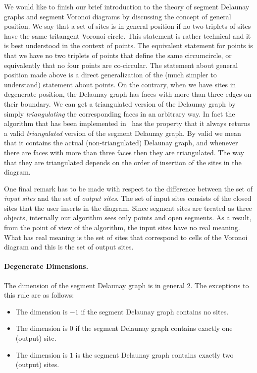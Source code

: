 We would like to finish our brief introduction to the theory of
segment Delaunay graphs and segment Voronoi diagrams by discussing the
concept of general position. We say that a set of sites is in general
position if no two triplets of sites have the same tritangent Voronoi
circle. This statement is rather technical and it is best understood
in the context of points. The equivalent statement for points is that
we have no two triplets of points that define the same circumcircle,
or equivalently that no four points are co-circular. The statement
about general position made above is a direct generalization of the
(much simpler to understand) statement about points. On the contrary,
when we have sites in degenerate position, the Delaunay graph has faces
with more than three edges on their boundary. We can get a
triangulated version of the Delaunay graph by simply {\em triangulating}
the corresponding faces in an arbitrary way. In fact the algorithm
that has been implemented in \cgal\ has the property that it always
returns a valid {\em triangulated} version of the segment Delaunay graph.
By valid we mean that it contains the actual (non-triangulated)
Delaunay graph, and whenever there are faces with more than three faces
then they are triangulated. The way that they are triangulated depends
on the order of insertion of the sites in the diagram.

One final remark has to be made with respect to the difference between
the set of \emph{input sites} and the set of \emph{output sites}. The
set of input sites consists of the closed sites that the user inserts
in the diagram. Since segment sites are treated as three objects,
internally our algorithm sees only points and open segments. As a
result, from the point of view of the algorithm, the input sites have
no real meaning. What has real meaning is the set of sites that
correspond to cells of the Voronoi diagram and this is the set of
output sites.

\paragraph{Degenerate Dimensions.}
The dimension of the segment Delaunay graph is in general 2. The
exceptions to this rule are as follows:
\begin{itemize}
\item The dimension is $-1$ if the segment Delaunay graph contains no
  sites.
\item The dimension is $0$ if the segment Delaunay graph contains exactly
  one (output) site.
\item The dimension is $1$ is the segment Delaunay graph contains exactly
  two (output) sites.
\end{itemize}


